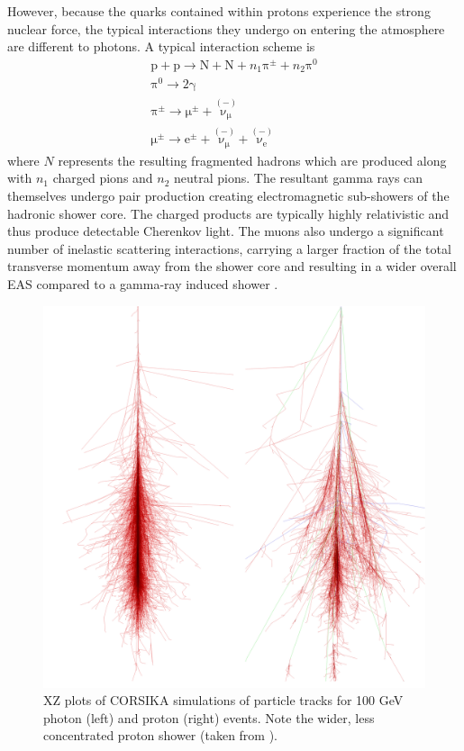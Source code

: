 However, because the quarks contained within protons experience the strong nuclear force, the typical interactions they undergo on entering the atmosphere are different to photons. A typical interaction scheme \cite{EAS} is
\begin{gather*}
\mathrm{p}+\mathrm{p}\rightarrow \mathrm{N}+\mathrm{N}+n_1 \mathrm{\pi^{\pm}}+n_2\mathrm{\pi^0} \\
\mathrm{\pi^0} \rightarrow \mathrm{2\gamma} \\
\mathrm{\mathrm{\pi^{\pm}}} \rightarrow \mathrm{\mu^{\pm}}+\mathrm{\overset{(-)}{\nu_{\mu}}}\\
\mathrm{\mu^{\pm}} \rightarrow \mathrm{e^{\pm}}+\mathrm{\overset{(-)}{\nu_{\mu}}}+\mathrm{\overset{(-)}{\nu_{e}}}
\end{gather*}
where $N$ represents the resulting fragmented hadrons which are produced along with $n_1$ charged pions and $n_2$ neutral pions. The resultant gamma rays can themselves undergo pair production creating electromagnetic sub-showers of the hadronic shower core. The charged products are typically highly relativistic and thus produce detectable Cherenkov light. The muons also undergo a significant number of inelastic scattering interactions, carrying a larger fraction of the total transverse momentum away from the shower core and resulting in a wider overall EAS compared to a gamma-ray induced shower \cite{tomthesis}.  


\begin{figure}
\begin{center}  

\includegraphics[width=0.5\columnwidth,trim=4 4 30 4,clip]{figures/showers.png}
 
\caption{XZ plots of CORSIKA simulations of particle tracks for 100 GeV photon (left) and proton (right) events. Note the wider, less concentrated proton shower (taken from \cite{corskplot}).}
\label{fig:image2}
\end{center}
\end{figure}
